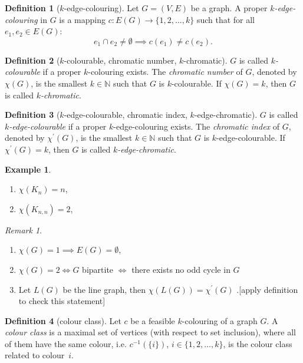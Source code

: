 \documentclass[a4paper]{article}
\theoremstyle{definition}\newtheorem*{defi*}{Definition}
\theoremstyle{remark}\newtheorem*{rem}{Remark}
\theoremstyle{plain}\newtheorem{lemma}[cnt]{Lemma}
\theoremstyle{definition}\newtheorem*{ex}{Example}
\theoremstyle{definition}\newtheorem*{exs}{Examples}
\theoremstyle{plain}\newtheorem{theorem}[cnt]{Theorem}
\theoremstyle{plain}\newtheorem{prop}[cnt]{Proposition}
\theoremstyle{plain}\newtheorem*{cor*}{Corollary}
\theoremstyle{definition}\newtheorem{nota}{Notation}
\theoremstyle{definition}\newtheorem*{nota*}{Notation}
\theoremstyle{plain}\newtheorem{conj}[cnt]{Conjecture}
\newcommand{\N}{\mathbb{N}}
\newcommand{\inv}[1]{{#1}^{-1}}
\begin{document}
\begin{defi*}[$k$-edge-colouring]
  Let $G=(V,E)$ be a graph. A proper \emph{$k$-edge-colouring} in $G$ is a mapping 
  $c: E(G) \to \{1,2,\dots,k\}$
  such that for all $e_1,e_2 \in E(G)$:
  \[ e_1 \cap e_2 \neq \emptyset \implies c(e_1) \neq c(e_2) \text{.} \]
\end{defi*}

\begin{defi*}[$k$-colourable, chromatic number, $k$-chromatic]
  $G$ is called \emph{$k$-colourable} if a proper $k$-colouring exists.
  The \emph{chromatic number} of $G$, denoted by $\chi(G)$, is the smallest $k \in \N$ such that $G$ is $k$-colourable.
  If $\chi(G) = k$, then $G$ is called \emph{$k$-chromatic}.
\end{defi*}

\begin{defi*}[$k$-edge-colourable, chromatic index, $k$-edge-chromatic]
  $G$ is called \emph{$k$-edge-colourable} if a proper $k$-edge-colouring exists.
  The \emph{chromatic index} of $G$, denoted by $\chi^\prime(G)$, is the smallest $k \in \N$ such that $G$ is $k$-edge-colourable.
  If $\chi^\prime(G) = k$, then $G$ is called \emph{$k$-edge-chromatic}.
\end{defi*}

\begin{ex}
  \begin{enumerate}[label=(\alph*)]
    \item $\chi(K_n) = n$,
    \item $\chi(K_{n,n}) = 2$, 
  \end{enumerate}  
\end{ex}

\begin{rem}
  \begin{enumerate}
    \item $\chi(G) = 1 \implies E(G) = \emptyset$,
    \item $\chi(G) = 2 \iff G$ bipartite $\iff$ there exists no odd cycle in $G$
    \item Let $L(G)$ be the line graph, then $\chi(L(G)) = \chi^\prime(G)$ .[apply definition to check this statement]
  \end{enumerate}
\end{rem}

\begin{defi*}[colour class]
  Let $c$ be a feasible $k$-colouring of a graph $G$. 
  A \emph{colour class} is a maximal set of vertices (with respect to set inclusion), where all of them have the same colour, 
  i.e. $\inv{c}(\{i\})$, $i \in \{1,2,\dots,k\}$, is the colour class related to colour~$i$.
\end{defi*}
\end{document}
